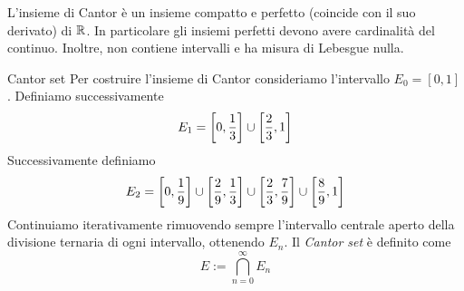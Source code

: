 \documentclass[a4paper]{article}
\begin{document}
\begin{radioactive}
L'insieme di Cantor è un insieme compatto e perfetto (coincide con il suo derivato)
di \(\mathbb{R}\). In particolare gli insiemi
perfetti devono avere cardinalità del continuo.
Inoltre, non contiene intervalli e ha misura di Lebesgue nulla.
\end{radioactive}

\begin{radioactive}
    \begin{center}
    \end{center}
\end{radioactive}

\begin{radioactive}
\begin{snippetdefinition}{Cantor set}
    Per costruire l'insieme di Cantor consideriamo l'intervallo
    \(E_0 = [0,1]\).
    Definiamo successivamente \[
        E_1 = \left[
            0, \frac13
        \right] \cup \left[\frac23, 1\right]
    \]
    Successivamente definiamo \[
        E_2 = \left[
            0, \frac19
        \right]
        \cup\left[
            \frac29, \frac13
        \right]
        \cup\left[
            \frac23, \frac79
        \right]
        \cup\left[
            \frac89, 1
        \right]
    \]
    Continuiamo iterativamente rimuovendo sempre
    l'intervallo centrale aperto della divisione ternaria di ogni intervallo, ottenendo \(E_n\).
    Il \emph{Cantor set} è definito come \[
        E := \bigcap_{n=0}^\infty E_n
    \]
\end{snippetdefinition}
\end{radioactive}
\end{document}
